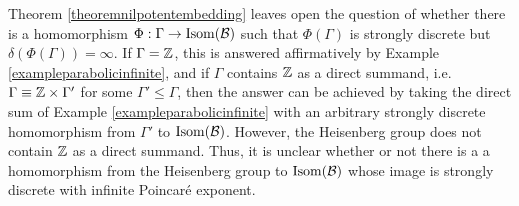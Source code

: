 \begin{remark}
\label{remarkheisenbergdeltainfty}
Theorem \ref{theoremnilpotentembedding} leaves open the question of whether there is a homomorphism $\Phi:\Gamma\to\operatorname{Isom}(\mathcal B)$ such that $\Phi(\Gamma)$ is strongly discrete but $\delta(\Phi(\Gamma)) = \infty$. If $\Gamma = \Z$, this is answered affirmatively by Example \ref{exampleparabolicinfinite}, and if $\Gamma$ contains $\Z$ as a direct summand, i.e. $\Gamma \equiv \Z\times\Gamma'$ for some $\Gamma'\leq\Gamma$, then the answer can be achieved by taking the direct sum of Example \ref{exampleparabolicinfinite} with an arbitrary strongly discrete homomorphism from $\Gamma'$ to $\operatorname{Isom}(\mathcal B)$. However, the Heisenberg group does not contain $\Z$ as a direct summand. Thus, it is unclear whether or not there is a a homomorphism from the Heisenberg group to $\operatorname{Isom}(\mathcal B)$ whose image is strongly discrete with infinite Poincar\'e exponent.
\end{remark}


